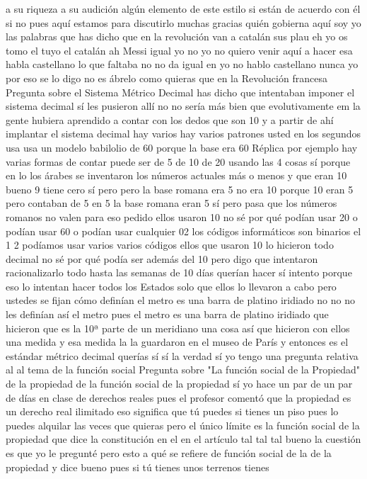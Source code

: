 a su riqueza a su audición algún elemento de este estilo si están de acuerdo con él si no pues aquí estamos para discutirlo muchas gracias
quién gobierna aquí soy yo las palabras
que has dicho que en la revolución van a catalán sus plau eh yo os tomo el tuyo el catalán ah Messi igual yo no
yo no quiero venir aquí a hacer esa habla castellano lo que faltaba no no da igual en
yo no hablo castellano nunca yo por eso se lo digo no es ábrelo como quieras que en la Revolución francesa
Pregunta sobre el Sistema Métrico Decimal
has dicho que intentaban imponer el sistema decimal sí les pusieron allí
no no sería más bien que evolutivamente
em la gente hubiera aprendido a contar con los dedos que son 10 y a partir de ahí implantar el sistema decimal
hay varios hay varios patrones usted en los segundos usa usa un modelo babilolio de 60 porque la base era 60
Réplica
por ejemplo hay varias formas de contar puede ser de 5 de 10 de 20 usando las 4 cosas
sí porque en lo los árabes se inventaron los números actuales más o menos
y que eran 10 bueno 9 tiene cero sí pero pero la base romana era 5
no era 10 porque 10 eran 5 pero contaban de 5 en 5 la base romana eran 5 sí
pero pasa que los números romanos no valen para eso pedido ellos usaron 10 no sé por qué podían usar 20
o podían usar 60 o podían usar cualquier 02 los códigos informáticos son binarios el 1 2
podíamos usar varios varios códigos ellos que usaron 10 lo hicieron todo decimal no sé por qué podía ser además del 10
pero digo que intentaron racionalizarlo todo hasta las semanas de 10 días querían hacer
sí intento porque eso lo intentan hacer todos los Estados solo que ellos lo llevaron a cabo pero ustedes se fijan cómo definían el metro
es una barra de platino iridiado no no no les definían así el metro pues el metro es una barra de platino iridiado que hicieron que es la 10ª parte de un meridiano
una cosa así que hicieron con ellos una medida y esa medida la la guardaron en el museo de París y entonces es el estándar métrico decimal
querías sí sí la verdad sí yo tengo una pregunta relativa al al tema de la función social
Pregunta sobre "La función social de la Propiedad"
de la propiedad de la función social de la propiedad sí yo hace un par de un par de días en clase de derechos reales
pues el profesor comentó que la propiedad es un derecho real ilimitado eso significa que tú puedes
si tienes un piso pues lo puedes alquilar las veces que quieras pero el único límite
es la función social de la propiedad que dice la constitución en el en el artículo tal tal tal bueno la cuestión es que yo le pregunté
pero esto a qué se refiere de función social de la de la propiedad y dice bueno pues si tú tienes unos terrenos tienes

